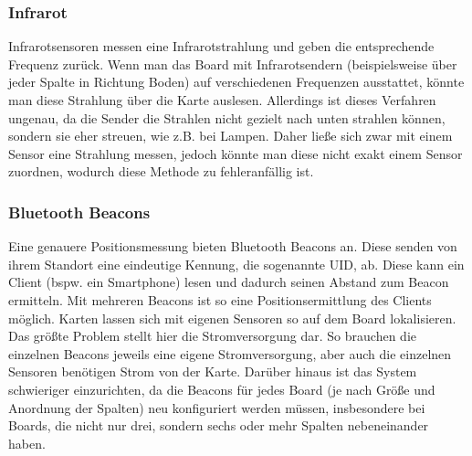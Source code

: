 \documentclass[12pt,titlepage]{scrartcl}
\begin{document}
			\subsubsection{Infrarot}
			Infrarotsensoren messen eine Infrarotstrahlung und geben die entsprechende Frequenz zurück. Wenn man das Board mit Infrarotsendern (beispielsweise über jeder Spalte in Richtung Boden) auf verschiedenen Frequenzen ausstattet, könnte man diese Strahlung über die Karte auslesen. Allerdings ist dieses Verfahren ungenau, da die Sender die Strahlen nicht gezielt nach unten strahlen können, sondern sie eher streuen, wie z.B. bei Lampen. Daher ließe sich zwar mit einem Sensor eine Strahlung messen, jedoch könnte man diese nicht exakt einem Sensor zuordnen, wodurch diese Methode zu fehleranfällig ist.
			\subsubsection{Bluetooth Beacons}
			Eine genauere Positionsmessung bieten Bluetooth Beacons an. Diese senden von ihrem Standort eine eindeutige Kennung, die sogenannte UID, ab. Diese kann ein Client (bspw. ein Smartphone) lesen und dadurch seinen Abstand zum Beacon ermitteln. Mit mehreren Beacons ist so eine Positionsermittlung des Clients möglich. Karten lassen sich mit eigenen Sensoren so auf dem Board lokalisieren. Das größte Problem stellt hier die Stromversorgung dar. So brauchen die einzelnen Beacons jeweils eine eigene Stromversorgung, aber auch die einzelnen Sensoren benötigen Strom von der Karte. Darüber hinaus ist das System schwieriger einzurichten, da die Beacons für jedes Board (je nach Größe und Anordnung der Spalten) neu konfiguriert werden müssen, insbesondere bei Boards, die nicht nur drei, sondern sechs oder mehr Spalten nebeneinander haben.
\end{document}
